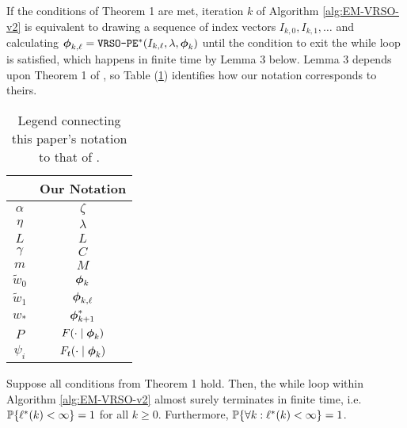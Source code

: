 If the conditions of Theorem 1 are met, iteration $k$ of Algorithm \ref{alg:EM-VRSO-v2} is equivalent to drawing a sequence of index vectors $I_{k,0},I_{k,1},\ldots$ and calculating $\boldsymbol{\phi}_{k,\ell} = \texttt{VRSO-PE}^*(I_{k,\ell},\lambda,\boldsymbol{\phi}_{k})$ until the condition to exit the while loop is satisfied, which happens in finite time by Lemma 3 below. Lemma 3 depends upon Theorem 1 of \citet{Johnson:2013}, so Table (\ref{tbl:notation}) identifies how our notation corresponds to theirs.
%
\begin{table}[]
\centering
\begin{tabular}{c|c}
\citet{Johnson:2013}                  & Our Notation                          \\ \hline
$\alpha$                              & $\zeta$                               \\
$\eta$                                & $\lambda$                             \\
$L$                                   & $L$                                   \\
$\gamma$                              & $C$                                   \\
$m$                                   & $M$                                   \\
$\tilde{w}_0$                         & $\boldsymbol{\phi}_{k}$                          \\
$\tilde{w}_1$                         & $\boldsymbol{\phi}_{k,\ell}$                     \\
$w_{*}$                               & $\boldsymbol{\phi}^*_{k+1}$                      \\
$P$                                   & $F(\cdot \mid \boldsymbol{\phi}_k)$              \\
$\psi_i$                              & $F_t(\cdot \mid \boldsymbol{\phi}_k)$                         
\end{tabular}
\caption{Legend connecting this paper's notation to that of \citet{Johnson:2013}.}
\label{tbl:notation}
\end{table}

\begin{lemma}
    Suppose all conditions from Theorem 1 hold. Then, the while loop within Algorithm \ref{alg:EM-VRSO-v2} almost surely terminates in finite time, i.e. $\mathbb{P}\{\ell^*(k) < \infty\} = 1$ for all $k \geq 0$. Furthermore, $\mathbb{P}\{\forall k : \ell^*(k) < \infty \} = 1$.
\end{lemma}

